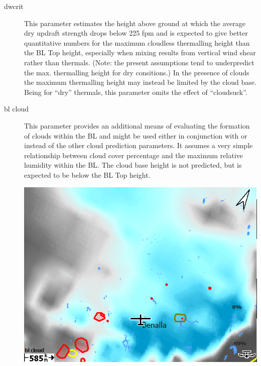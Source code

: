 \documentclass[a4paper,12pt]{refrep}
\begin{document}
\begin{description}
\item[dwcrit]  
This parameter estimates the height above ground at which the average
dry updraft strength drops below 225 fpm and is expected to give
better quantitative numbers for the maximum cloudless thermalling
height than the BL Top height, especially when mixing results from
vertical wind shear rather than thermals.  (Note: the present
assumptions tend to underpredict the max. thermalling height for dry
consitions.) In the presence of clouds the maximum thermalling height
may instead be limited by the cloud base.  Being for ``dry'' thermals,
this parameter omits the effect of ``cloudsuck''.

\item[bl cloud]  
This parameter provides an additional means of evaluating the
formation of clouds within the BL and might be used either in
conjunction with or instead of the other cloud prediction parameters.
It assumes a very simple relationship between cloud cover percentage
and the maximum relative humidity within the BL.  The cloud base
height is not predicted, but is expected to be below the BL Top
height.

\begin{center}
\includegraphics[angle=0,width=\linewidth,keepaspectratio='true']{figures/rasp-blcloudpct.png}
\end{center}


\end{description}
\end{document}
